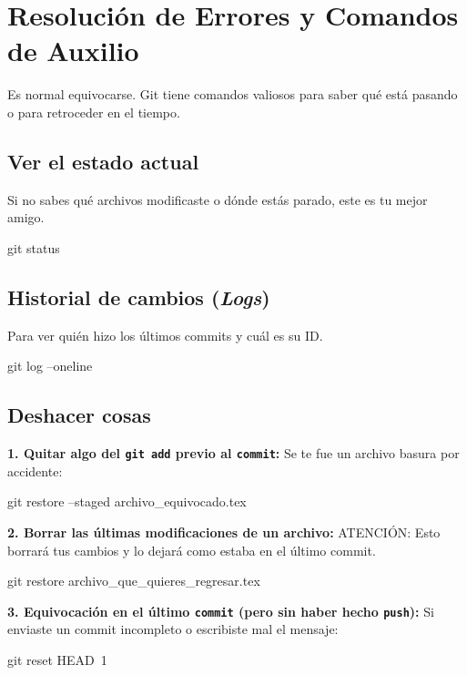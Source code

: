 \documentclass[letterpaper,12pt,oneside]{article}
\begin{document}
\section{Resolución de Errores y Comandos de Auxilio}
Es normal equivocarse. Git tiene comandos valiosos para saber qué está pasando o para retroceder en el tiempo.

\subsection{Ver el estado actual}
Si no sabes qué archivos modificaste o dónde estás parado, este es tu mejor amigo.
\begin{gitbox}
git status
\end{gitbox}

\subsection{Historial de cambios (\textit{Logs})}
Para ver quién hizo los últimos commits y cuál es su ID.
\begin{gitbox}[]
git log --oneline
\end{gitbox}

\subsection{Deshacer cosas}
\textbf{1. Quitar algo del \texttt{git add} previo al \texttt{commit}:}
Se te fue un archivo basura por accidente:
\begin{gitbox}
git restore --staged archivo_equivocado.tex
\end{gitbox}

\textbf{2. Borrar las últimas modificaciones de un archivo:}
ATENCIÓN: Esto borrará tus cambios y lo dejará como estaba en el último commit.
\begin{gitbox}
git restore archivo_que_quieres_regresar.tex
\end{gitbox}

\textbf{3. Equivocación en el último \texttt{commit} (pero sin haber hecho \texttt{push}):}
Si enviaste un commit incompleto o escribiste mal el mensaje:
\begin{gitbox}
git reset HEAD~1
\end{gitbox}
\end{document}
